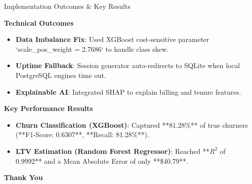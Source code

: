 \documentclass{beamer}
\begin{document}
\begin{frame}{Implementation Outcomes \& Key Results}

\textbf{Technical Outcomes}
\begin{itemize}
    \item \textbf{Data Imbalance Fix}: Used XGBoost cost-sensitive parameter `scale\_pos\_weight = 2.7686` to handle class skew.
    \item \textbf{Uptime Fallback}: Session generator auto-redirects to SQLite when local PostgreSQL engines time out.
    \item \textbf{Explainable AI}: Integrated SHAP to explain billing and tenure features.
\end{itemize}

\vspace{4pt}
\textbf{Key Performance Results}
\begin{itemize}
    \item \textbf{Churn Classification (XGBoost)}: Captured **81.28\%** of true churners (**F1-Score: 0.6307**, **Recall: 81.28\%**).
    \item \textbf{LTV Estimation (Random Forest Regressor)}: Reached **$R^2$ of 0.9992** and a Mean Absolute Error of only **\$40.79**.
\end{itemize}

\end{frame}

\begin{frame}[plain]
\vspace{2cm}
\begin{center}
\begin{tcolorbox}[
  enhanced, colback=lavenderbg, colframe=lavenderbg,
  arc=4mm, boxrule=0pt, width=0.7\textwidth,
  halign=center, valign=center,
  drop shadow
]
{\Large\textbf{Thank You}}
\end{tcolorbox}
\end{center}

\end{frame}
\end{document}
